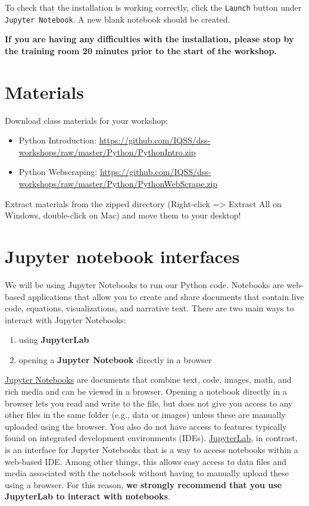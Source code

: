 \documentclass[]{book}
\providecommand{\tightlist}{%
  \setlength{\itemsep}{0pt}\setlength{\parskip}{0pt}}
\begin{document}
To check that the installation is working correctly, click the
\texttt{Launch} button under \texttt{Jupyter\ Notebook}. A new blank
notebook should be created.

\textbf{If you are having any difficulties with the installation, please
stop by the training room 20 minutes prior to the start of the
workshop.}

\section{Materials}\label{materials-1}

Download class materials for your workshop:

\begin{itemize}
\tightlist
\item
  Python Introduction:
  \url{https://github.com/IQSS/dss-workshops/raw/master/Python/PythonIntro.zip}
\item
  Python Webscraping:
  \url{https://github.com/IQSS/dss-workshops/raw/master/Python/PythonWebScrape.zip}
\end{itemize}

Extract materials from the zipped directory (Right-click =\textgreater{}
Extract All on Windows, double-click on Mac) and move them to your
desktop!

\section{Jupyter notebook interfaces}\label{jupyter-notebook-interfaces}

We will be using Jupyter Notebooks to run our Python code. Notebooks are
web-based applications that allow you to create and share documents that
contain live code, equations, visualizations, and narrative text. There
are two main ways to interact with Jupyter Notebooks:

\begin{enumerate}
\def\labelenumi{\arabic{enumi}.}
\tightlist
\item
  using \textbf{JupyterLab}
\item
  opening a \textbf{Jupyter Notebook} directly in a browser
\end{enumerate}

\href{https://jupyter-notebook.readthedocs.io/en/stable/}{Jupyter
Notebooks} are documents that combine text, code, images, math, and rich
media and can be viewed in a browser. Opening a notebook directly in a
browser lets you read and write to the file, but does not give you
access to any other files in the same folder (e.g., data or images)
unless these are manually uploaded using the browser. You also do not
have access to features typically found on integrated development
environments (IDEs).
\href{https://jupyterlab.readthedocs.io/en/stable/}{JupyterLab}, in
contrast, is an interface for Jupyter Notebooks that is a way to access
notebooks within a web-based IDE. Among other things, this allows easy
access to data files and media associated with the notebook without
having to manually upload these using a browser. For this reason,
\textbf{we strongly recommend that you use JupyterLab to interact with
notebooks}.
\end{document}
